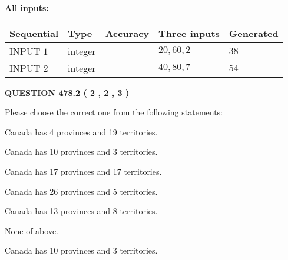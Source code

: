 \documentclass[12pt]{article}
\begin{document}
   
   
   
\noindent{}
   
   
   
   
\noindent\vspace{0.1in}\hspace{-0.08in} {\textbf{\Large{All inputs: }}}
   
   
  
  
\noindent\begin{tabular}{|l|l|l|l|l|}
\hline
 Sequential & Type & Accuracy & Three inputs & Generated \\ 
\hline
 
 
  INPUT $  1 $ & integer &  & $
 20
 , 
 60
 , 
 2
 $ & $ 38 $ 
 \\  \hline  
 
 
  INPUT $  2 $ & integer &  & $
 40
 , 
 80
 , 
 7
 $ & $ 54 $ 
 \\  \hline  
 \end{tabular}
   
   
  
\vspace{0.2in}
  
{\textbf{\Large{QUESTION
478.2 
 ( 2 , 2 , 3 )
}}}
  
  
Please choose the correct one from the following statements:
 
 
Canada has   4 provinces and  19 territories.
 
 
Canada has 10  provinces and 3 territories.
 
 
Canada has  17 provinces and  17 territories.
 
 
Canada has  26 provinces and  5 territories.
 
 
Canada has  13 provinces and  8 territories.
 
 
 None of above.
 
 
\noindent{}
 
 
Canada has 10  provinces and 3 territories.
 
 
\noindent{}
 
 
   
\end{document}
